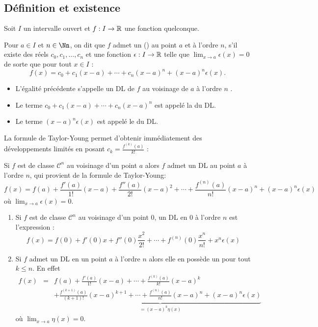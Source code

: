 \documentclass[class=report,crop=false]{standalone}
\begin{document}
\subsection{Définition et existence}


Soit $I$ un intervalle ouvert et $f : I \to \mathbb{R}$ une fonction quelconque.

\begin{definition}
Pour $a\in I$ et $n\in \Nn$, on dit que $f$ admet un
 () au point $a$ et à l'ordre $n$, s'il existe
des réels $c_0, c_1,\ldots,c_n$
et une fonction $\epsilon : I \to \mathbb{R}$ telle que $\lim_{x\to a} \epsilon(x)=0$
de sorte que pour tout $x\in I$ :
$$f(x)=c_0+c_1 (x-a)+\cdots+c_n(x-a)^n+(x-a)^n\epsilon(x).$$
\begin{itemize}
\item L'égalité précédente s'appelle un DL de $f$ au voisinage de $a$ à l'ordre $n$ .

\item Le terme $c_0+c_1(x-a)+\cdots+c_n(x-a)^n$ est appelé la  du DL.

\item Le terme $(x-a)^n\epsilon(x)$ est appelé le  du DL.
\end{itemize}
\end{definition}


La formule de Taylor-Young permet d'obtenir immédiatement des développements limités
en posant $c_k = \frac{f^{(k)}(a)}{k!}$ :
\begin{proposition}
Si $f$ est de classe $\mathcal{C}^n$ au voisinage d'un point $a$
alors $f$ admet un DL au point $a$ à l'ordre $n$, qui provient de la
formule de Taylor-Young:
$$f(x)= f(a)+\frac{f'(a)}{1!}(x-a)+ \frac{f''(a)}{2!}(x-a)^2+\cdots
+\frac{f^{(n)}(a)}{n!}(x-a)^n+(x-a)^n\epsilon(x)$$
où $\lim_{x\to a}\epsilon(x)=0$.
\end{proposition}

\begin{remarque*}
\sauteligne
\begin{enumerate}
  \item Si $f$ est de classe $\mathcal{C}^n$
au voisinage d'un point $0$, un DL en $0$ à l'ordre $n$ est l'expression :
$$f(x)= f(0)+f'(0)x+f''(0)\frac{x^2}{2!}+\cdots
+f^{(n)}(0)\frac{x^n}{n!} + x^n\epsilon(x)$$

  \item Si $f$ admet un DL en un point $a$ à l'ordre $n$
alors elle en possède un pour tout $k \le n$.
En effet
\begin{eqnarray*}
f(x) & = & f(a)+\frac{f'(a)}{1!}(x-a)+\cdots + \frac{f^{(k)}(a)}{k!}(x-a)^k
\\
&& + \underbrace{\frac{f^{(k+1)}(a)}{(k+1)!}(x-a)^{k+1} + \cdots
+\frac{f^{(n)}(a)}{n!}(x-a)^n+(x-a)^n\epsilon(x)}_{=(x-a)^k\eta(x)}
\end{eqnarray*}
où $\lim_{x\to a}\eta(x)=0$.
\end{enumerate}
\end{remarque*}
\end{document}
